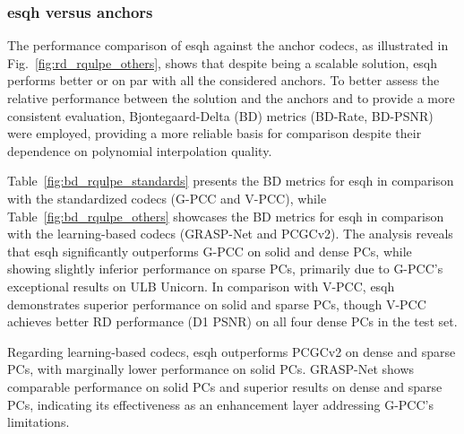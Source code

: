 

\subsubsection{\gls{esqh} versus anchors}


The performance comparison of \gls{esqh} against the anchor codecs, as illustrated in Fig.~\ref{fig:rd_rqulpe_others}, shows that despite being a scalable solution, \gls{esqh} performs better or on par with all the considered anchors. To better assess the relative performance between the solution and the anchors and to provide a more consistent evaluation, Bjontegaard-Delta (BD) metrics (BD-Rate, BD-PSNR) were employed, providing a more reliable basis for comparison despite their dependence on polynomial interpolation quality.

Table~\ref{fig:bd_rqulpe_standards} presents the BD metrics for \gls{esqh} in comparison with the standardized codecs (G-PCC and V-PCC), while Table~\ref{fig:bd_rqulpe_others} showcases the BD metrics for \gls{esqh} in comparison with the learning-based codecs (GRASP-Net and PCGCv2).
The analysis reveals that \gls{esqh} significantly outperforms G-PCC on solid and dense PCs, while showing slightly inferior performance on sparse PCs, primarily due to G-PCC's exceptional results on ULB Unicorn. In comparison with V-PCC, \gls{esqh} demonstrates superior performance on solid and sparse PCs, though V-PCC achieves better RD performance (D1 PSNR) on all four dense PCs in the test set.

Regarding learning-based codecs, \gls{esqh} outperforms PCGCv2 on dense and sparse PCs, with marginally lower performance on solid PCs. GRASP-Net shows comparable performance on solid PCs and superior results on dense and sparse PCs, indicating its effectiveness as an enhancement layer addressing G-PCC's limitations.

